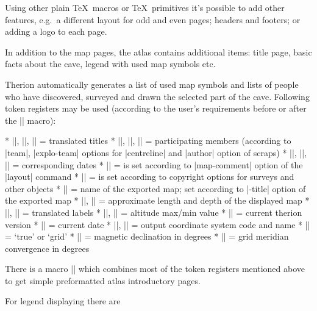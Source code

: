 Using other plain \TeX\ macros or \TeX\ primitives it's possible to add other
features, e.g.~a different layout for odd and even pages; headers and footers;
or adding a logo to each page.

In addition to the map pages, the atlas contains additional items: title page, basic
facts about the cave, legend with used map symbols etc.

Therion automatically generates a list of used map symbols and lists of people
who have discovered, surveyed and drawn the selected part of the cave.
Following token registers may be used (according to the user's requirements
before or after the |\insertmaps| macro):

\list
* |\explotitle|, |\topotitle|, |\cartotitle| = translated titles
* |\exploteam|, |\topoteam|, |\cartoteam| = participating members
  (according to |team|, |explo-team| options for |centreline| and |author|
  option of scraps)
* |\explodate|, |\topodate|, |\cartodate| = corresponding dates
* |\comment| = is set according to |map-comment| option of the |layout|
  command
* |\copyrights| = is set according to copyright options for surveys and other
  objects
* |\cavename| = name of the exported map; set according to |-title| option
  of the exported map
* |\cavelength|, |\cavedepth| = approximate length and depth of the displayed map
* |\cavelengthtitle|, |\cavedepthtitle| = translated labels
* |\cavemaxz|, |\caveminz| = altitude max/min value
* |\thversion| = current therion version
* |\currentdate| = current date
* |\outcscode|, |\outcsname| = output coordinate system code and name
* |\northdir| = `true' or `grid'
* |\magdecl| = magnetic declination in degrees
* |\gridconv| = grid meridian convergence in degrees
\endlist

There is a macro |\atlastitlepages| which combines most of the token registers
mentioned above to get simple preformatted atlas introductory pages.

For legend displaying there are

